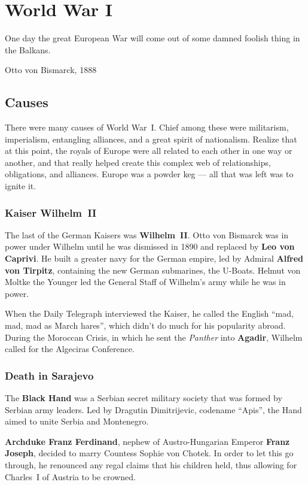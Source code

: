 \chapter{World War I}

\epigraph{%
  One day the great European War will come out of some damned foolish thing in the Balkans.
}{Otto von Bismarck, 1888}

\section{Causes}

There were many causes of World War~I.
Chief among these were militarism, imperialism, entangling alliances, and a great spirit of nationalism.
Realize that at this point, the royals of Europe were all related to each other in one way or another,
and that really helped create this complex web of relationships, obligations, and alliances.
Europe was a powder keg --- all that was left was to ignite it.

\subsection*{Kaiser Wilhelm~II}

The last of the German Kaisers was \textbf{Wilhelm~II}.
Otto von Bismarck was in power under Wilhelm until he was dismissed in 1890
and replaced by \textbf{Leo von Caprivi}.
He built a greater navy for the German empire, led by Admiral \textbf{Alfred von Tirpitz},
containing the new German submarines, the U-Boats.
Helmut von Moltke the Younger led the General Staff of Wilhelm's army while he was in power.

When the Daily Telegraph interviewed the Kaiser,
he called the English ``mad, mad, mad as March hares'', which didn't do much for his popularity abroad.
During the Moroccan Crisis, in which he sent the \textit{Panther} into \textbf{Agadir},
Wilhelm called for the Algeciras Conference.

\subsection*{Death in Sarajevo}

The \textbf{Black Hand} was a Serbian secret military society that was formed by Serbian army leaders.
Led by Dragutin Dimitrijevic, codename ``Apis'', the Hand aimed to unite Serbia and Montenegro.

\textbf{Archduke Franz Ferdinand}, nephew of Austro-Hungarian Emperor \textbf{Franz Joseph},
decided to marry Countess Sophie von Chotek.
In order to let this go through, he renounced any regal claims that his children held,
thus allowing for Charles~I of Austria to be crowned.

